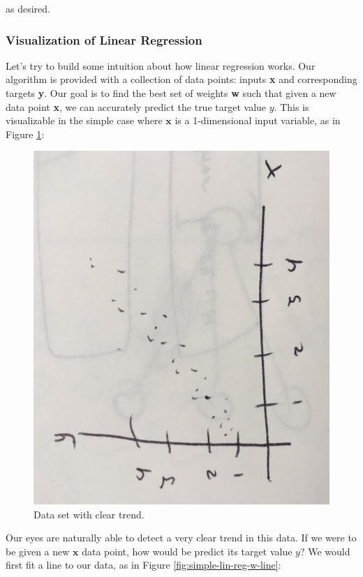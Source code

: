 as desired.

\subsubsection{Visualization of Linear Regression}
Let's try to build some intuition about how linear regression works. Our algorithm is provided with a collection of data points: inputs \textbf{x} and corresponding targets \textbf{y}. Our goal is to find the best set of weights \textbf{w} such that given a new data point \textbf{x}, we can accurately predict the true target value $y$. This is visualizable in the simple case where $\textbf{x}$ is a 1-dimensional input variable, as in Figure \ref{fig:simple-lin-reg}:

\begin{figure}[H]
    \centering
    \includegraphics[width=0.5\paperwidth,angle=270]{../LinearRegression/fig/simple_lin_reg.jpg}
    \caption{Data set with clear trend.}
    \label{fig:simple-lin-reg}
\end{figure}

Our eyes are naturally able to detect a very clear trend in this data. If we were to be given a new $\textbf{x}$ data point, how would be predict its target value $y$? We would first fit a line to our data, as in Figure \ref{fig:simple-lin-reg-w-line}:


